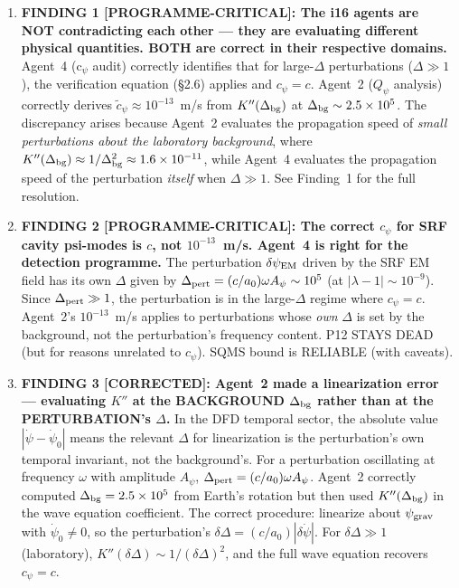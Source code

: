 \documentclass[11pt]{article}
\newcommand{\ee}[1]{\times 10^{#1}}
\newcommand{\dpsiEM}{\delta\psi_{\rm EM}}
\begin{document}
\begin{tcolorbox}[colback=red!5!white, colframe=red!60!black,
  title=\textbf{W4i17 TOP 5 FINDINGS}]

\begin{enumerate}

\item \textbf{FINDING 1 [PROGRAMME-CRITICAL]: The i16 agents are NOT
  contradicting each other --- they are evaluating different physical
  quantities. BOTH are correct in their respective domains.}
  Agent~4 (c$_\psi$ audit) correctly identifies that for large-$\Delta$
  perturbations ($\Delta \gg 1$), the verification equation (\S2.6)
  applies and $c_\psi = c$. Agent~2 ($Q_\psi$ analysis) correctly
  derives $\tilde{c}_\psi \approx 10^{-13}$~m/s from $K''(\Delta_{\rm bg})$
  at $\Delta_{\rm bg} \sim 2.5\ee{5}$. The discrepancy arises because
  Agent~2 evaluates the propagation speed of \emph{small perturbations
  about the laboratory background}, where $K''(\Delta_{\rm bg}) \approx
  1/\Delta_{\rm bg}^2 \approx 1.6\ee{-11}$, while Agent~4 evaluates
  the propagation speed of the perturbation \emph{itself} when $\Delta
  \gg 1$. See Finding~1 for the full resolution.

\item \textbf{FINDING 2 [PROGRAMME-CRITICAL]: The correct $c_\psi$ for
  SRF cavity psi-modes is $c$, not $10^{-13}$~m/s. Agent~4 is right
  for the detection programme.} The perturbation $\dpsiEM$ driven by
  the SRF EM field has its own $\Delta$ given by
  $\Delta_{\rm pert} = (c/a_0)\omega A_\psi \sim 10^5$ (at $|\lambda-1|
  \sim 10^{-9}$). Since $\Delta_{\rm pert} \gg 1$, the perturbation
  is in the large-$\Delta$ regime where $c_\psi = c$. Agent~2's
  $10^{-13}$~m/s applies to perturbations whose \emph{own} $\Delta$ is
  set by the background, not the perturbation's frequency content.
  P12 STAYS DEAD (but for reasons unrelated to $c_\psi$).
  SQMS bound is RELIABLE (with caveats).

\item \textbf{FINDING 3 [CORRECTED]: Agent~2 made a linearization error
  --- evaluating $K''$ at the BACKGROUND $\Delta_{\rm bg}$ rather than
  at the PERTURBATION's $\Delta$.} In the DFD temporal sector, the
  absolute value $|\dot\psi - \dot\psi_0|$ means the relevant $\Delta$
  for linearization is the perturbation's own temporal invariant, not
  the background's. For a perturbation oscillating at frequency $\omega$
  with amplitude $A_\psi$, $\Delta_{\rm pert} = (c/a_0)\omega A_\psi$.
  Agent~2 correctly computed $\Delta_{\rm bg} = 2.5\ee{5}$ from
  Earth's rotation but then used $K''(\Delta_{\rm bg})$ in the wave
  equation coefficient. The correct procedure: linearize about
  $\psi_{\rm grav}$ with $\dot\psi_0 \neq 0$, so the perturbation's
  $\delta\Delta = (c/a_0)|\delta\dot\psi|$. For $\delta\Delta \gg 1$
  (laboratory), $K''(\delta\Delta) \sim 1/(\delta\Delta)^2$, and the
  full wave equation recovers $c_\psi = c$.


\end{enumerate}
\end{tcolorbox}
\end{document}
